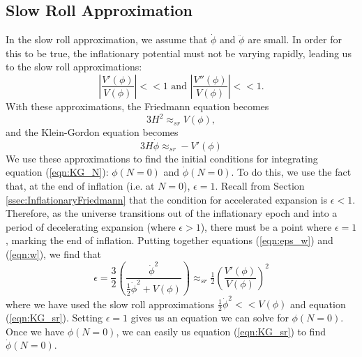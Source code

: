 \documentclass[onecolumn,apj]{emulateapj}
\def\half{\tfrac{1}{2}}
\begin{document}
\subsection{Slow Roll Approximation}
In the slow roll approximation, we assume that $\dot \phi$ and $\ddot \phi$ are small. In order for this to be true, the inflationary potential must not be varying rapidly, leading us to the slow roll approximations:
\begin{equation}
\left | \frac{V'(\phi)}{V(\phi)} \right | <<1 \text{\ \ \ and\ \ \ } \left | \frac{V''(\phi)}{V(\phi)} \right | <<1 .
\label{eqn:SlowRollApprox}
\end{equation}
With these approximations, the Friedmann equation becomes
\begin{equation}
3 H^2 \approx_{sr} V(\phi),
\label{eqn:Friedmann_sr}
\end{equation}
and the Klein-Gordon equation becomes
\begin{equation}
3 H \dot \phi \approx_{sr} -V'(\phi)
\label{eqn:KG_sr}
\end{equation}
We use these approximations to find the initial conditions for integrating equation (\ref{eqn:KG_N}): $\phi(N=0)$ and $\dot \phi(N=0)$. To do this, we use the fact that, at the end of inflation (i.e. at $N=0$), $\epsilon = 1$. Recall from Section \ref{ssec:InflationaryFriedmann} that the condition for accelerated expansion is $\epsilon<1$. Therefore, as the universe transitions out of the inflationary epoch and into a period of decelerating expansion (where $\epsilon>1$), there must be a point where $\epsilon=1$, marking the end of inflation. Putting together equations (\ref{eqn:eps_w}) and (\ref{eqn:w}), we find that 
\begin{equation}
\epsilon = \frac{3}{2} \left ( \frac{\dot \phi^2}{\half \dot \phi^2 + V(\phi)} \right ) \approx_{sr} \half \left (\frac{V'(\phi)}{V(\phi)} \right ) ^2 
\end{equation}
where we have used the slow roll approximations $\half \dot \phi^2 << V(\phi)$ and equation (\ref{eqn:KG_sr}). Setting $\epsilon=1$ gives us an equation we can solve for $\phi(N=0)$. Once we have $\phi(N=0)$, we can easily us equation (\ref{eqn:KG_sr}) to find $\dot \phi(N=0)$. 


{}
\end{document}
